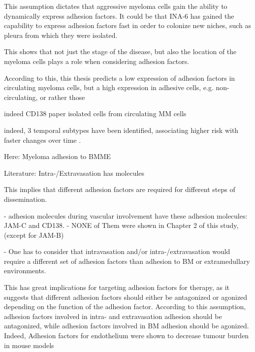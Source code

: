 
This assumption dictates that aggressive myeloma cells gain the ability
to dynamically express adhesion factors.
It could be that INA-6 has gained the capability to express adhesion factors
fast in order to colonize new niches, such as pleura from which they were
isolated.

This shows that not just the stage of the disease, but also the location of the
myeloma cells plays a role when considering adhesion factors.

According to this, this thesis
predicts a low expression of adhesion factors in circulating myeloma cells,
but a high expression in adhesive cells, e.g. non-circulating, or rather those

indeed CD138 paper isolated cells from circulating MM cells \cite{akhmetzyanovaDynamicCD138Surface2020}

indeed, 3 temporal subtypes have been identified, associating higher risk with
faster changes over time \cite{keatsClonalCompetitionAlternating2012}.


Here: Myeloma adhesion to BMME

Literature: Intra-/Extravasation has molecules

This implies that different adhesion factors are required for different steps of
dissemination.




- adhesion molecules during vascular involvement have these adhesion molecules: JAM-C
and CD138.
- NONE of Them were shown in Chapter 2 of this study, (except for JAM-B)


- One has to consider that intravasation and/or intra-/extravasation would require a different
set of adhesion factors than adhesion to BM or extramedullary environments.

This has great implications for targeting adhesion factors for therapy, as it
suggests that different adhesion factors should either be antagonized or
agonized depending on the function of the adhesion factor. According to this
assumption, adhesion factors involved in intra- and extravasation adhesion should be
antagonized, while adhesion factors involved in BM adhesion  should be agonized. Indeed, Adhesion factors for endothelium
were shown to decrease tumour burden in mouse models \cite{asosinghUniquePathwayHoming2001a,mrozikTherapeuticTargetingNcadherin2015}

